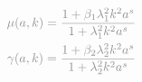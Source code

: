 \documentclass[preview]{standalone}
\begin{document}
\begin{gather}
\notag
\textcolor{Gray}{\mu(a,k) = \frac{1+\beta_1 \lambda_1^2 k^2 a^s}{1+ \lambda_1^2 k^2 a^s} }\\
\notag
\textcolor{Gray}{\gamma(a,k) = \frac{1+\beta_2 \lambda_2^2 k^2 a^s}{1+ \lambda_2^2 k^2 a^s} }
\end{gather}
\end{document}
